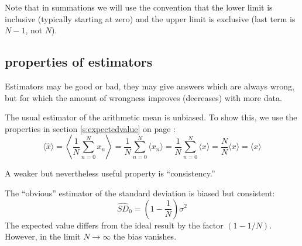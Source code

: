
Note that in summations we will use the convention that the lower
limit is inclusive (typically starting at zero) and the upper limit is
exclusive (last term is $N-1$, not $N$).

\subsection{properties of estimators}

Estimators may be good or bad, they may give answers which are always
wrong, but for which the amount of wrongness improves (decreases) with
more data.


\begin{example}{The usual estimator of the arithmetic mean is
    unbiased.}  To show this, we use the properties in section
  \ref{s:expectedvalue} on page \pageref{s:expectedvalue}:
\begin{displaymath}
\langle \hat{x} \rangle = 
\left\langle\frac{1}{N}\sum_{n=0}^N x_n \right\rangle =
\frac{1}{N}\sum_{n=0}^N \langle x_n \rangle =
\frac{1}{N}\sum_{n=0}^N \langle x \rangle = 
\frac{N}{N}\langle x \rangle = \langle x \rangle
\end{displaymath}
\end{example}

A weaker but nevertheless useful property is ``consistency.''


\begin{example}The ``obvious'' estimator of the standard deviation is
biased but consistent:
\begin{displaymath}
\hat{SD}_0 = \left(1 - \frac{1}{N}\right) \sigma^2 
\end{displaymath}
The expected value differs from the ideal result by the
factor $(1 - 1/N)$.  However, in the limit $N\rightarrow\infty$ the bias
vanishes.
\end{example}

